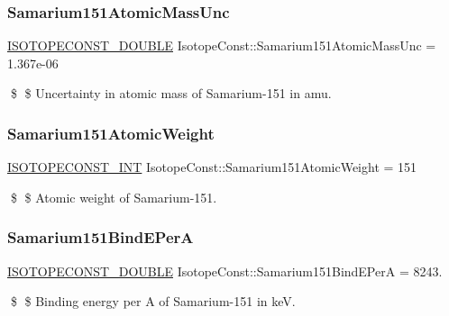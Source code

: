 \subsubsection{\texorpdfstring{Samarium151\+Atomic\+Mass\+Unc}{Samarium151AtomicMassUnc}}
{\footnotesize\ttfamily \mbox{\hyperlink{group___isotope_const-_macros_ga8f45a7272ce02c0b4c65c44636ed719a}{I\+S\+O\+T\+O\+P\+E\+C\+O\+N\+S\+T\+\_\+\+D\+O\+U\+B\+LE}} Isotope\+Const\+::\+Samarium151\+Atomic\+Mass\+Unc = 1.\+367e-\/06}

\$ \$ Uncertainty in atomic mass of Samarium-\/151 in amu. \mbox{\label{group___isotope_const-_samarium-_sm151_ga951a263a723b6a78b00642eb7eb875c7}} 
\subsubsection{\texorpdfstring{Samarium151\+Atomic\+Weight}{Samarium151AtomicWeight}}
{\footnotesize\ttfamily \mbox{\hyperlink{group___isotope_const-_macros_ga5f18360b3e99483a35c32d789e62621c}{I\+S\+O\+T\+O\+P\+E\+C\+O\+N\+S\+T\+\_\+\+I\+NT}} Isotope\+Const\+::\+Samarium151\+Atomic\+Weight = 151}

\$ \$ Atomic weight of Samarium-\/151. \mbox{\label{group___isotope_const-_samarium-_sm151_ga0dc70cb0fa2f5c8e627f6a186840d235}} 
\subsubsection{\texorpdfstring{Samarium151\+Bind\+E\+PerA}{Samarium151BindEPerA}}
{\footnotesize\ttfamily \mbox{\hyperlink{group___isotope_const-_macros_ga8f45a7272ce02c0b4c65c44636ed719a}{I\+S\+O\+T\+O\+P\+E\+C\+O\+N\+S\+T\+\_\+\+D\+O\+U\+B\+LE}} Isotope\+Const\+::\+Samarium151\+Bind\+E\+PerA = 8243.}

\$ \$ Binding energy per A of Samarium-\/151 in keV. \mbox{\label{group___isotope_const-_samarium-_sm151_ga5dbc64446fdb085e04f153bebd6ea154}} 
